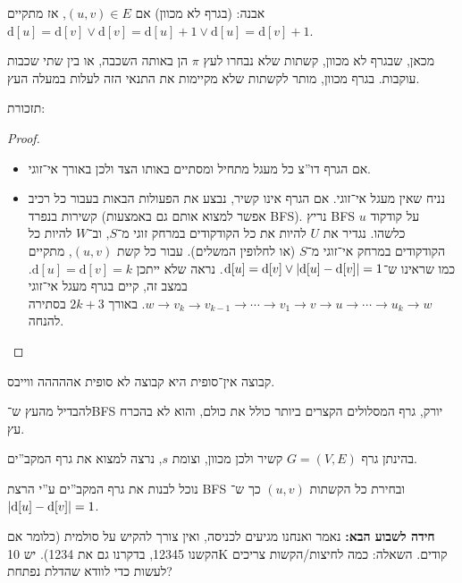 \documentclass[]{../../../../tex/classes/styledArticle}
\begin{document}
	אבנה: (בגרף לא מכוון) אם $(u, v) \in E$, אז מתקיים $\mathrm{d}[u] = \mathrm{d}[v] \lor \mathrm{d}[v] = \mathrm{d}[u] + 1 \lor \mathrm{d}[u] = \mathrm{d}[v] + 1$. 
	
	מכאן, שבגרף לא מכוון, קשתות שלא נבחרו לעץ $\pi$ הן באותה השכבה, או בין שתי שכבות עוקבות. בגרף מכוון, מותר לקשתות שלא מקיימות את התנאי הזה לעלות במעלה העץ. 
	
	תזכורת: 
	
	\begin{proof}
		\begin{itemize}
			\item[$\implies$]אם הגרף דו''צ כל מעגל מתחיל ומסתיים באותו הצד ולכן באורך אי־זוגי. 
			\item[$\impliedby$]נניח שאין מעגל אי־זוגי. אם הגרף אינו קשיר, נבצע את הפעולות הבאות בעבור כל רכיב קשירות בנפרד (אפשר למצוא אותם גם באמצעות BFS). נריץ BFS על קודקוד $u$ כלשהו. נגדיר את $U$ להיות את כל הקודקודים במרחק זוגי מ־$S$, וב־$W$ להיות כל הקודקודים במרחק אי־זוגי מ־$S$ (או לחלופין המשלים). עבור כל קשת $(u, v)$, מתקיים כמו שראינו ש־$\mathrm{d}[u] = \mathrm{d}[v] \lor \sof{\mathrm{d}[u] - \mathrm{d}[v]} = 1$. נראה שלא ייתכן $\mathrm{d}[u] = \mathrm{d}[v] = k$. במצב זה, קיים בגרף מעגל אי־זוגי $w \to v_k \to v_{k - 1} \to \cdots \to v_1 \to v \to u \to \cdots \to u_k \to w$. באורך $2k + 3$ בסתירה להנחה. 
		\end{itemize}\envendproof
	\end{proof}
	
	קבוצה אין־סופית היא קבוצה לא סופית אההההה ווייבס. 
	
	להבדיל מהעץ ש־BFS יורק, גרף המסלולים הקצרים ביותר כולל את כולם, והוא לא בהכרח עץ. 
	
	בהינתן גרף $G = (V, E)$ קשיר ולכן מכוון, וצומת $s$, נרצה למצוא את גרף המקב''ים. 
	
	נוכל לבנות את גרף המקב''ים ע''י הרצת BFS ובחירת כל הקשתות $(u, v)$ כך ש־$\sof{\mathrm{d}[u] - \mathrm{d}[v]} = 1$. 
	
	\textbf{חידה לשבוע הבא: }נאמר ואנחנו מגיעים לכניסה, ואין צורך להקיש על סולמית (כלומר אם הקשנו 12345, בדקרנו גם את 1234). יש 10K קודים. השאלה: כמה לחיצות/הקשות צריכים לעשות כדי לוודא שהדלת נפתחת? 
	
	




	
	
	\ndoc
	
	
	
	
\end{document}
